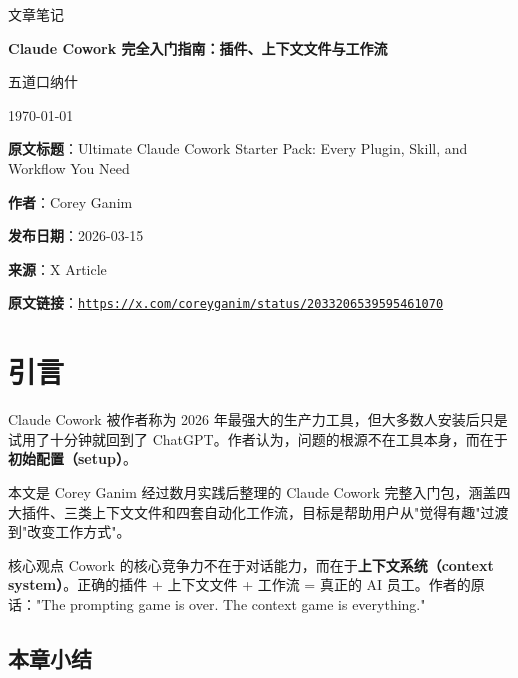 \documentclass[a4paper]{article}
\newcommand{\notetitle}{Claude Cowork 完全入门指南：插件、上下文文件与工作流}
\newcommand{\noteauthors}{五道口纳什}
\newcommand{\notedate}{\today}
\newcommand{\articleauthor}{Corey Ganim}
\newcommand{\articlepublishdate}{2026-03-15}
\newcommand{\articleurl}{https://x.com/coreyganim/status/2033206539595461070}
\begin{document}
\begin{titlepage}
\centering
{\Large 文章笔记\par}
\vspace{1.2cm}
{\huge\bfseries \notetitle\par}
\vspace{0.8cm}
{\large \noteauthors\par}
\vspace{0.3cm}
{\large \notedate\par}
\vspace{2cm}

\vfill
\begin{tcolorbox}[width=0.9\textwidth, colback=black!2!white, colframe=black!60, sharp corners]
\textbf{原文标题}：Ultimate Claude Cowork Starter Pack: Every Plugin, Skill, and Workflow You Need\par
\textbf{作者}：\articleauthor\par
\textbf{发布日期}：\articlepublishdate\par
\textbf{来源}：X Article\par
\textbf{原文链接}：\href{\articleurl}{\nolinkurl{\articleurl}}
\end{tcolorbox}
\end{titlepage}

\tableofcontents
\newpage


\section{引言}

Claude Cowork 被作者称为 2026 年最强大的生产力工具，但大多数人安装后只是试用了十分钟就回到了 ChatGPT。作者认为，问题的根源不在工具本身，而在于\textbf{初始配置（setup）}。

本文是 Corey Ganim 经过数月实践后整理的 Claude Cowork 完整入门包，涵盖四大插件、三类上下文文件和四套自动化工作流，目标是帮助用户从"觉得有趣"过渡到"改变工作方式"。

\begin{importantbox}{核心观点}
Cowork 的核心竞争力不在于对话能力，而在于\textbf{上下文系统（context system）}。正确的插件 + 上下文文件 + 工作流 = 真正的 AI 员工。作者的原话："The prompting game is over. The context game is everything."
\end{importantbox}

\subsection{本章小结}
\end{document}
